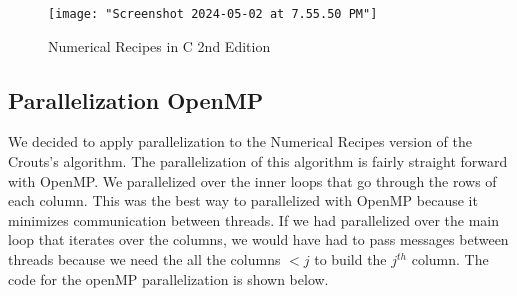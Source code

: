 \documentclass[12pt,letterpaper]{article}
\begin{document}
   \begin{figure}[H]
   	\centering
   	\texttt{[image: "Screenshot 2024-05-02 at 7.55.50 PM"]}
    \caption{Numerical Recipes in C 2nd Edition}
   	\label{fig:crout}
   \end{figure}


	\subsection{Parallelization OpenMP}
	We decided to apply parallelization to the Numerical Recipes version of the Crouts's algorithm. The parallelization of this algorithm is fairly straight forward with OpenMP. We parallelized over the inner loops that go through the rows of each column. This was the best way to parallelized with OpenMP because it minimizes communication between threads. If we had parallelized over the main loop that iterates over the columns, we would have had to pass messages between threads because we need the all the columns \(< j\) to build the \(j^{th}\) column. The code for the openMP parallelization is shown below.
\end{document}
